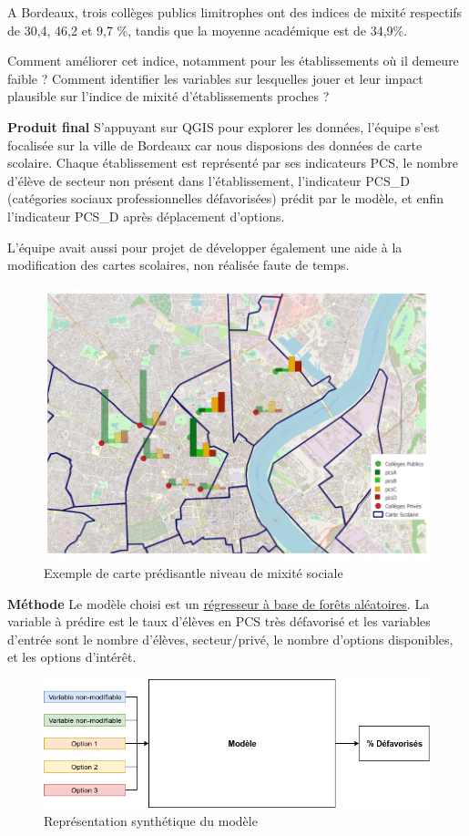 \documentclass[]{book}
\begin{document}
A Bordeaux, trois collèges publics limitrophes ont des indices de mixité
respectifs de 30,4, 46,2 et 9,7 \%, tandis que la moyenne académique est
de 34,9\%.

Comment améliorer cet indice, notamment pour les établissements où il
demeure faible ? Comment identifier les variables sur lesquelles jouer
et leur impact plausible sur l'indice de mixité d'établissements proches
?

\textbf{Produit final} S'appuyant sur QGIS pour explorer les données,
l'équipe s'est focalisée sur la ville de Bordeaux car nous disposions
des données de carte scolaire. Chaque établissement est représenté par
ses indicateurs PCS, le nombre d'élève de secteur non présent dans
l'établissement, l'indicateur PCS\_D (catégories sociaux
professionnelles défavorisées) prédit par le modèle, et enfin
l'indicateur PCS\_D après déplacement d'options.

L'équipe avait aussi pour projet de développer également une aide à la
modification des cartes scolaires, non réalisée faute de temps.

\begin{figure}

{\centering \includegraphics[width=0.6\linewidth]{./img/Diagramme_Publics_Prives} 

}

\caption{Exemple de carte prédisantle  niveau de mixité sociale}\label{fig:unnamed-chunk-2}
\end{figure}

\textbf{Méthode} Le modèle choisi est un
\href{https://fr.wikipedia.org/wiki/For\%C3\%AAt_d\%27arbres_d\%C3\%A9cisionnels}{régresseur
à base de forêts aléatoires}. La variable à prédire est le taux d'élèves
en PCS très défavorisé et les variables d'entrée sont le nombre
d'élèves, secteur/privé, le nombre d'options disponibles, et les options
d'intérêt.

\begin{figure}

{\centering \includegraphics[width=0.6\linewidth]{./img/model-diag} 

}

\caption{Représentation synthétique du modèle}\label{fig:unnamed-chunk-3}
\end{figure}
\end{document}
